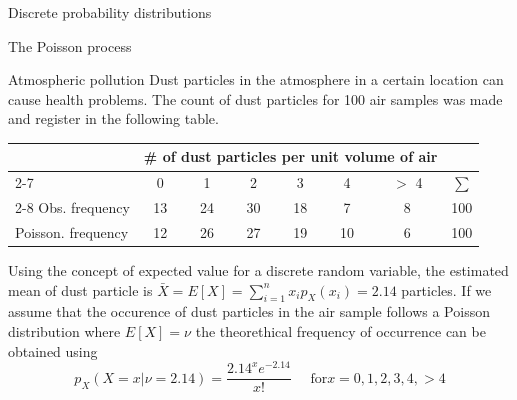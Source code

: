 \documentclass[8pt]{beamer}
\renewcommand{\emph}[1]{\textcolor{myorange}{#1}}
\begin{document}
 \begin{frame}{Discrete probability distributions}
    \begin{block}{The \alert{Poisson} process}
    \end{block}

    \begin{exampleblock}{Atmospheric pollution}
Dust particles in the atmosphere in a certain location can cause health problems. The count of dust particles for 100 air samples was made and register in the following table.

    \begin{tabular}{lccccccc}
        & \multicolumn{6}{c}{\# of dust particles per unit volume of air} & \\
        \cline{2-7}
        & 0 &  1 &  2 & 3 & 4 & $>$ 4 & $\sum$\\
        \cline{2-8}
        Obs. frequency & 13 & 24 & 30 & 18 & 7 & 8 & 100 \\
        Poisson. frequency & 12 & 26 & 27 & 19 & 10 & 6 & 100 \\
    \end{tabular}

    Using the concept of \emph{expected value} for a \emph{discrete random variable}, the estimated \emph{mean} of dust particle is $\bar{X} = E[X] = \sum_{i=1}^n x_i p_X (x_i) = 2.14$ particles. If we assume that the occurence of dust particles in the air sample follows a \emph{Poisson distribution} where $E[X] = \nu$ the theorethical frequency of occurrence can be obtained using
    \[
        p_X (X = x | \nu = 2.14) = \frac{2.14^x e^{-2.14}}{x!} \quad \text{ for} x=0,1,2,3,4,  >4
    \]

    \end{exampleblock}
\end{frame}
\end{document}
